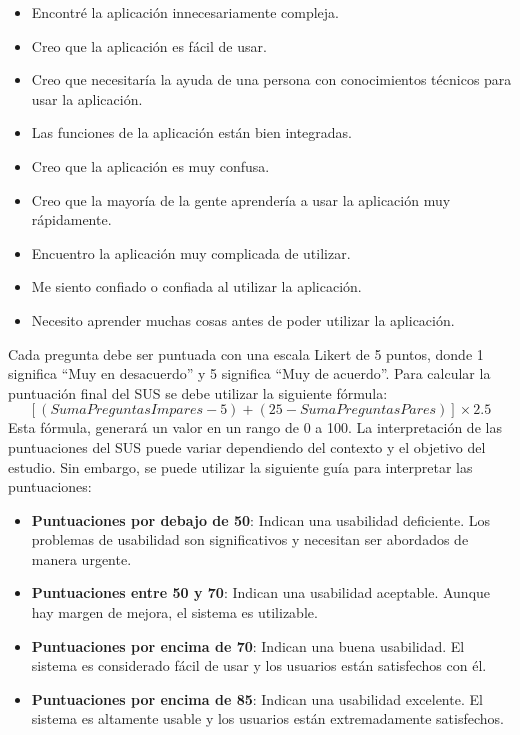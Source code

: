 \begin{itemize}
\begin{itemize}
              \item Encontré la aplicación innecesariamente compleja.
              \item Creo que la aplicación es fácil de usar.
              \item Creo que necesitaría la ayuda de una persona con conocimientos técnicos para usar la aplicación.
              \item Las funciones de la aplicación están bien integradas.
              \item Creo que la aplicación es muy confusa.
              \item Creo que la mayoría de la gente aprendería a usar la aplicación muy rápidamente.
              \item Encuentro la aplicación muy complicada de utilizar.
              \item Me siento confiado o confiada al utilizar la aplicación.
              \item Necesito aprender muchas cosas antes de poder utilizar la aplicación.
          \end{itemize}
          Cada pregunta debe ser puntuada con una escala Likert de 5 puntos, donde 1 significa ``Muy en desacuerdo'' y 5 significa ``Muy de acuerdo''. Para calcular la puntuación final del SUS se debe utilizar la siguiente fórmula:
          \[[(SumaPreguntasImpares - 5) + (25 - SumaPreguntasPares)]\times2.5\]
          Esta fórmula, generará un valor en un rango de 0 a 100. La interpretación de las puntuaciones del SUS puede variar dependiendo del contexto y el objetivo del estudio. Sin embargo, se puede utilizar la siguiente guía para interpretar las puntuaciones:
          \begin{itemize}
              \item \textbf{Puntuaciones por debajo de 50}: Indican una usabilidad deficiente. Los problemas de usabilidad son significativos y necesitan ser abordados de manera urgente.
              \item \textbf{Puntuaciones entre 50 y 70}: Indican una usabilidad aceptable. Aunque hay margen de mejora, el sistema es utilizable.
              \item \textbf{Puntuaciones por encima de 70}: Indican una buena usabilidad. El sistema es considerado fácil de usar y los usuarios están satisfechos con él.
              \item \textbf{Puntuaciones por encima de 85}: Indican una usabilidad excelente. El sistema es altamente usable y los usuarios están extremadamente satisfechos.

\end{itemize}
\end{itemize}
